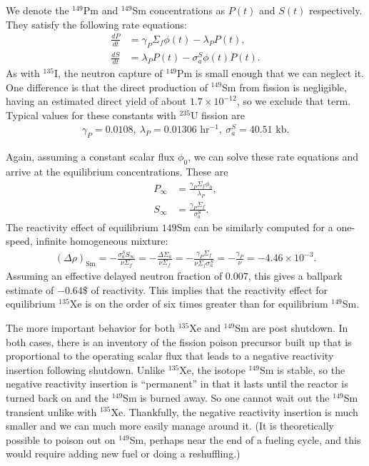 We denote the $^{149}$Pm and $^{149}$Sm concentrations as $P(t)$ and $S(t)$ respectively. They satisfy the following rate equations:
\begin{align}
  \frac{dP}{dt} &= \gamma_P \Sigma_f \phi(t) - \lambda_P P(t), \\
  \frac{dS}{dt} &= \lambda_P P(t) - \sigma_a^S \phi(t) P(t).
\end{align}
As with $^{135}$I, the neutron capture of $^{149}$Pm is small enough that we can neglect it. One difference is that the direct production of $^{149}$Sm from fission is negligible, having an estimated direct yield of about $1.7 \times 10^{-12}$, so we exclude that term. Typical values for these constants with $^{235}$U fission are
\begin{align}
  \gamma_P = 0.0108, \ \lambda_P = 0.01306 \text{ hr$^{-1}$}, \ \sigma_a^S = 40.51 \text{ kb}. \nonumber
\end{align}

Again, assuming a constant scalar flux $\phi_0$, we can solve these rate equations and arrive at the equilibrium concentrations. These are
\begin{subequations}
\begin{align}
  P_\infty &= \frac{ \gamma_P \Sigma_f \phi_0 }{ \lambda_P } , \\
  S_\infty &= \frac{ \gamma_P \Sigma_f }{ \sigma_a^S } .
\end{align}
\end{subequations}
The reactivity effect of equilibrium ${149}$Sm can be similarly computed for a one-speed, infinite homogeneous mixture:
\begin{align}
  ( \Delta \rho )_\text{Sm} = -\frac{\sigma_a^S S_\infty}{\nu\Sigma_f} = -\frac{\Delta\Sigma_a}{\nu\Sigma_f} = -\frac{ \gamma_P \Sigma_f }{ \nu \Sigma_f \sigma_a^S } = -\frac{\gamma_P}{\nu} = -4.46 \times 10^{-3}.
\end{align}
Assuming an effective delayed neutron fraction of 0.007, this gives a ballpark estimate of $-0.64$\$ of reactivity. This implies that the reactivity effect for equilibrium $^{135}$Xe is on the order of six times greater than for equilibrium $^{149}$Sm.

The more important behavior for both $^{135}$Xe and $^{149}$Sm are post shutdown. In both cases, there is an inventory of the fission poison precursor built up that is proportional to the operating scalar flux that leads to a negative reactivity insertion following shutdown. Unlike $^{135}$Xe, the isotope $^{149}$Sm is stable, so the negative reactivity insertion is ``permanent'' in that it lasts until the reactor is turned back on and the $^{149}$Sm is burned away. So one cannot wait out the $^{149}$Sm transient unlike with $^{135}$Xe. Thankfully, the negative reactivity insertion is much smaller and we can much more easily manage around it. (It is theoretically possible to poison out on $^{149}$Sm, perhaps near the end of a fueling cycle, and this would require adding new fuel or doing a reshuffling.)

